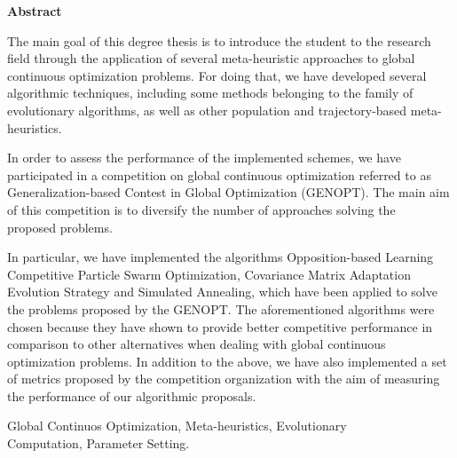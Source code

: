 \documentclass[spanish,a4paper,14pt,oneside]{extreport}
\newenvironment{summary}
{\par\noindent\begin{center}\textbf{Abstract}\end{center}\begin{itshape}\par\noindent}
{\end{itshape}}
\newenvironment{keywords}
{\begin{list}{}{\setlength{\leftmargin}{1em}}\item[\hskip\labelsep \bfseries Keywords:]}
{\end{list}}
\begin{document}
\newpage  %
\begin{summary}
{\em

The main goal of this degree thesis is to introduce the student to the research field through the application of several meta-heuristic approaches to global continuous optimization problems. For doing that, we have developed several algorithmic techniques, including some methods belonging to the family of evolutionary algorithms, as well as other population and trajectory-based meta-heuristics.

In order to assess the performance of the implemented schemes, we have participated in a competition on global continuous optimization referred to as Generalization-based Contest in Global Optimization (GENOPT). The main aim of this competition is to diversify the number of approaches solving the \\
proposed problems.

In particular, we have implemented the algorithms Opposition-based Learning Competitive Particle Swarm Optimization, Covariance Matrix Adaptation Evolution Strategy and Simulated Annealing, which have been applied to solve the problems proposed by the GENOPT. The aforementioned algorithms were chosen because they have shown to provide better competitive performance in comparison to other alternatives when dealing with global continuous optimization problems. In addition to the above, we have also implemented a set of metrics proposed by the competition organization with the aim of measuring the performance of our algorithmic proposals.

}

\begin{keywords}
Global Continuos Optimization, Meta-heuristics, Evolutionary \\ 
Computation, Parameter Setting.
\end{keywords}

\end{summary}

\newpage{\pagestyle{empty}}
\thispagestyle{empty}



\pagestyle{myheadings} %
\end{document}
